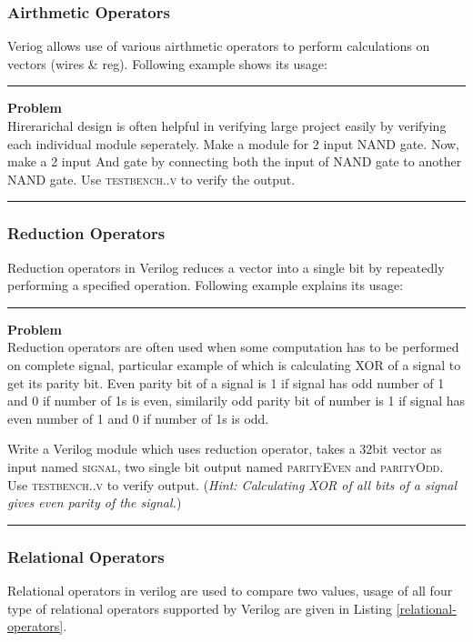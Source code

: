 \documentclass[a4paper,10pt]{article}
\newcommand{\ano}{\text{1}}
\theoremstyle{mytheor}
\newcommand{
  \insertverilog}[3]{
  
}
\newcounter{problemNumber}
\newcommand {
  \insertProblem}[1]{
  \vspace{0.5cm}
  \hrule
  \vspace{0.3cm}

  {\color{greatblue}\textbf{\large{Problem \theproblemNumber}}}
  \vspace{2pt}\\#1

  \addtocounter{problemNumber}{1}
  \vspace{0.2cm}
  \hrule  
  \vspace{0.5cm}
}
\begin{document}
\subsubsection*{Airthmetic Operators}
Veriog allows use of various airthmetic operators to perform
calculations on vectors (wires \& reg). Following example shows its
usage:
\insertverilog{./verilog_files/airthmeticOperators.v}{airthmetic-operators}{\text{Functioning of airthmetic operator}}

\insertProblem{Hirerarichal design is often helpful in verifying large project easily by verifying each individual module seperately. Make a module for 2 input NAND gate. Now, make a 2 input And gate by connecting both the input of NAND gate to another NAND gate. Use \textsc{testbench{\ano}.{\theproblemNumber}.v} to verify the output.}


\subsubsection*{Reduction Operators}
Reduction operators in Verilog reduces a vector into a single
bit by repeatedly performing a specified operation. Following example 
explains its usage: 
\insertverilog{./verilog_files/reductionOperators.v}{reduction-operators}{\text{Functioning of reduction operator}}

\break
\insertProblem {
  Reduction operators are often used when some computation has to be performed on complete signal, particular example of which is calculating XOR of a signal to get its parity bit. Even parity bit of a signal is 1 if signal has odd number of 1 and 0 if number of 1s is even, similarily odd parity bit of number is 1 if signal has even number of 1 and 0 if number of 1s is odd.

  Write a Verilog module which uses reduction operator, takes a 32bit vector as input named \textsc{signal}, two single bit output named \textsc{parityEven} and \textsc{parityOdd}. Use \textsc{testbench{\ano}.{\theproblemNumber}.v} to verify output. (\textit{Hint: Calculating XOR of all bits of a signal gives even parity of the signal.})
}

\subsubsection*{Relational Operators}
Relational operators in verilog are used to compare two values, usage
of all four type of relational operators supported by Verilog are
given in Listing \ref{relational-operators}.
\insertverilog{./verilog_files/relationalOperators.v}{relational-operators}{\text{Functioning of relational operator}}
  
\end{document}
